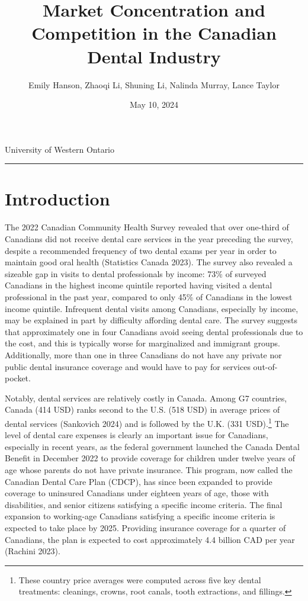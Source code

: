 \documentclass[a4paper,11pt]{article}
\title{\vspace{-1.2cm} Market Concentration and Competition in the Canadian Dental Industry}
\author{Emily Hanson, Zhaoqi Li, Shuning Li, Nalinda Murray, Lance Taylor }
\date{May 10, 2024}
\begin{document}
\maketitle \vspace{-.4 in}
\begin{center}
University of Western Ontario
\rule{\textwidth}{1pt} 
\end{center}




\begin{abstract}
\lipsum[5]
\end{abstract}

\section{Introduction}
The 2022 Canadian Community Health Survey revealed that over one-third of Canadians did not receive dental care services in the year preceding the survey, despite a recommended frequency of two dental exams per year in order to maintain good oral health (Statistics Canada 2023). The survey also revealed a sizeable gap in visits to dental professionals by income: 73\% of surveyed Canadians in the highest income quintile reported having visited a dental professional in the past year, compared to only 45\% of Canadians in the lowest income quintile. Infrequent dental visits among Canadians, especially by income, may be explained in part by difficulty affording dental care. The survey suggests that approximately one in four Canadians avoid seeing dental professionals due to the cost, and this is typically worse for marginalized and immigrant groups. Additionally, more than one in three Canadians do not have any private nor public dental insurance coverage and would have to pay for services out-of-pocket.

Notably, dental services are relatively costly in Canada. Among G7 countries, Canada (414 USD) ranks second to the U.S. (518 USD) in average prices of dental services (Sankovich 2024) and is followed by the U.K. (331 USD).\footnote{These country price averages were computed across five key dental treatments: cleanings, crowns, root canals, tooth extractions, and fillings.} The level of dental care expenses is clearly an important issue for Canadians, especially in recent years, as the federal government launched the Canada Dental Benefit in December 2022 to provide coverage for children under twelve years of age whose parents do not have private insurance. This program, now called the Canadian Dental Care Plan (CDCP), has since been expanded to provide coverage to uninsured Canadians under eighteen years of age, those with disabilities, and senior citizens satisfying a specific income criteria. The final expansion to working-age Canadians satisfying a specific income criteria is expected to take place by 2025. Providing insurance coverage for a quarter of Canadians, the plan is expected to cost approximately 4.4 billion CAD per year (Rachini 2023).
\end{document}
